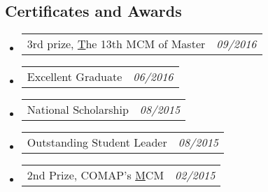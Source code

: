 \documentclass[10pt,letterpaper]{article}
\makeatletter
\newcommand{\headerrow}[2]
{\begin{tabular*}{\linewidth}{l@{\extracolsep{\fill}}r}
	#1 &
	#2 \\
\end{tabular*}}
\makeatother
\begin{document}
\subsection*{Certificates and Awards}

\begin{itemize}
	\parskip=0.1em
	
	\item 
	\headerrow
		{3rd prize, \href{http://gmcm.seu.edu.cn/}The 13th MCM of Master}
		{\emph{09/2016}}
	\item 
	\headerrow
		{Excellent Graduate}
		{\emph{06/2016}}
	\item 
	\headerrow
		{National Scholarship}
		{\emph{08/2015}}	
	\item 
	\headerrow
		{Outstanding Student Leader}
		{\emph{08/2015}}
	\item 
	\headerrow
		{2nd Prize, COMAP's \href{https://www.comap.com/undergraduate/contests/}MCM}
		{\emph{02/2015}}
\end{itemize}
\end{document}

